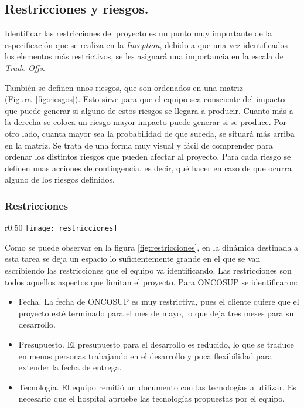 \subsection{Restricciones y riesgos.}
\label{subsec:restriccionesRiesgos}


Identificar las restricciones del proyecto es un punto muy importante de la especificación que se realiza en la \emph{Inception}, debido a que una vez identificados los elementos más restrictivos, se les asignará una importancia en la escala de \emph{Trade Offs}. 



También se definen unos riesgos, que son ordenados en una matriz (Figura~\ref{fig:riesgos}). Esto sirve para que el equipo sea consciente del impacto que puede generar si alguno de estos riesgos se llegara a producir. Cuanto más a la derecha se coloca un riesgo mayor impacto puede generar si se produce. Por otro lado, cuanta mayor sea la probabilidad de que suceda, se situará más arriba en la matriz. Se trata de una forma muy visual y fácil de comprender para ordenar los distintos riesgos que pueden afectar al proyecto. Para cada riesgo se definen unas acciones de contingencia, es decir, qué hacer en caso de que ocurra alguno de los riesgos definidos.

\subsubsection{Restricciones}
\label{subsubsec:restricciones}
\begin{wrapfigure}{r}{0.50\textwidth} %
    \centering
    \texttt{[image: restricciones]}
    \caption{Restricciones y Trade offs}
    \label{fig:restricciones}
\end{wrapfigure}
Como se puede observar en la figura \ref{fig:restricciones}, en la dinámica destinada a esta tarea se deja un espacio lo suficientemente grande en el que se van escribiendo las restricciones que el equipo va identificando. Las restricciones son todos aquellos aspectos que limitan el proyecto. Para ONCOSUP se identificaron:

\begin{itemize}
\item Fecha. La fecha de ONCOSUP es muy restrictiva, pues el cliente quiere que el proyecto esté terminado para el mes de mayo, lo que deja tres meses para su desarrollo.
\item Presupuesto. El presupuesto para el desarrollo es reducido, lo que se traduce en menos personas trabajando en el desarrollo y poca flexibilidad para extender la fecha de entrega.
\item Tecnología. El equipo remitió un documento con las tecnologías a utilizar. Es necesario que el hospital apruebe las tecnologías propuestas por el equipo.
\end{itemize}

